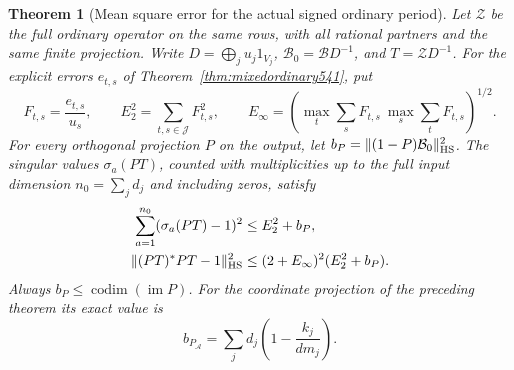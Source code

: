 \documentclass[a4paper,11pt]{article}
\newtheorem{theorem}[proposition]{Theorem}
\theoremstyle{definition}
\theoremstyle{remark}
\numberwithin{equation}{section}
\begin{document}
\begin{theorem}[Mean square error for the actual signed ordinary period]
\leavevmode\label{thm:ordinarysingular544}
Let \(\mathcal Z\) be the full ordinary operator on the same
rows, with all rational partners and the same finite projection.
Write \(D=\bigoplus_j u_j1_{V_j}\), \(\mathcal B_0=\mathcal B D^{-1}\),
and \(T=\mathcal ZD^{-1}\). For the explicit errors \(e_{t,s}\)
of Theorem~\ref{thm:mixedordinary541}, put
\[
   F_{t,s}=\frac{e_{t,s}}{u_s},\qquad
   E_2^2=\sum_{t,s\in\mathcal J} F_{t,s}^2,\qquad
   E_\infty=
     \left(\max_t\sum_s F_{t,s}\ \max_s\sum_t F_{t,s}\right)^{1/2}.
\]
For every orthogonal projection \(P\) on the output, let
\(b_P=\|(1-P)\mathcal B_0\|_{\rm HS}^2\). The singular values
\(\sigma_a(PT)\), counted with multiplicities up to the full
input dimension \(n_0=\sum_jd_j\) and including zeros, satisfy
\begin{align}
       \sum_{a=1}^{n_0}(\sigma_a(PT)-1)^2
         &\le E_2^2+b_P, \label{eq:svdisp544}\\
       \|(PT)^*PT-1\|_{\rm HS}^2
         &\le (2+E_\infty)^2(E_2^2+b_P). \label{eq:gramdisp544}
\end{align}
Always \(b_P\le\operatorname{codim}(\operatorname{im}P)\).
For the coordinate projection of the preceding theorem its
exact value is
\[
             b_{P_{\mathcal A}}
                 =\sum_j d_j\left(1-\frac{k_j}{d m_j}\right).
\]
\end{theorem}
\end{document}
